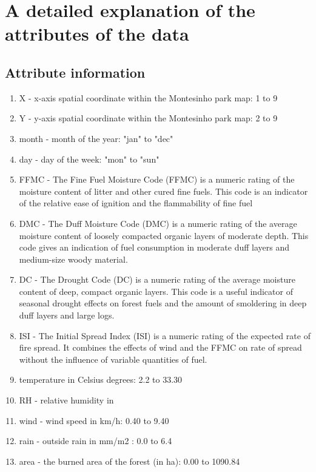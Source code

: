 \section{A detailed explanation of the attributes of the data}
\subsection*{Attribute information}
	\begin{enumerate}
	\item X - x-axis spatial coordinate within the Montesinho park map: 1 to 9
	\item Y - y-axis spatial coordinate within the Montesinho park map: 2 to 9
	\item month - month of the year: "jan" to "dec" 
	\item day - day of the week: "mon" to "sun"
	\item FFMC - The Fine Fuel Moisture Code (FFMC) is a numeric rating of the moisture content of litter and other cured fine fuels. This code is an indicator of the relative ease of ignition and the flammability of fine fuel
	\item DMC - The Duff Moisture Code (DMC) is a numeric rating of the average moisture content of loosely compacted organic layers of moderate depth. This code gives an indication of fuel consumption in moderate duff layers and medium-size woody material.
	\item DC - The Drought Code (DC) is a numeric rating of the average moisture content of deep, compact organic layers. This code is a useful indicator of seasonal drought effects on forest fuels and the amount of smoldering in deep duff layers and large logs.
	\item ISI - The Initial Spread Index (ISI) is a numeric rating of the expected rate of fire spread. It combines the effects of wind and the FFMC on rate of spread without the influence of variable quantities of fuel.
	\item temperature in Celsius degrees: 2.2 to 33.30
	\item RH - relative humidity in %
	\item wind - wind speed in km/h: 0.40 to 9.40 
	\item rain - outside rain in mm/m2 : 0.0 to 6.4 
	\item area - the burned area of the forest (in ha): 0.00 to 1090.84 
	\end{enumerate}	

